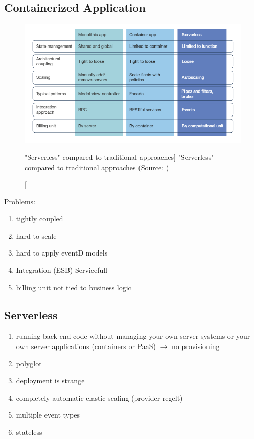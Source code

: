 \subsection{Containerized Application}\label{chp:container}

\begin{figure}[ht]
    \includegraphics[width=\linewidth]{images/serverless/demyst.png}\centering
    \caption
    ["Serverless" compared to traditional approaches]
    {"Serverless" compared to traditional approaches (Source: \cite{Hammond2018DemystifyingComputing})}
    \label{fig:slessCompared}
\end{figure}

Problems:
\begin{enumerate}
    \item tightly coupled
    \item hard to scale
    \item hard to apply eventD models
    \item Integration (ESB)  Servicefull
    \item billing unit not tied to business logic
\end{enumerate}


\subsection{Serverless}\label{sec:serverless}\label{chp:serverless}


\begin{enumerate}\label{lst:serverlessCharacteristics}
    \item running back end code without managing your own server systems or your own server applications (containers or PaaS) $\longrightarrow$ no provisioning
    \item polyglot
    \item deployment is strange 
    \item completely automatic elastic scaling (provider regelt)
    \item multiple event types
    \item stateless
\end{enumerate}
\autocite{Roberts2016ServerlessArchitectures}

